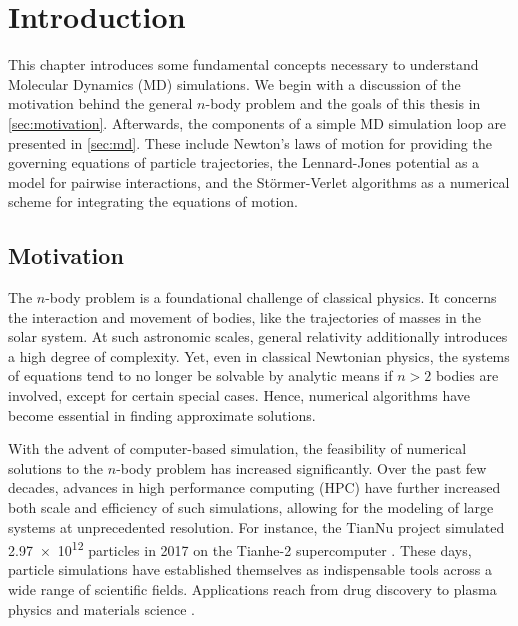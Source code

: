 \chapter[Introduction]{Introduction}
\label{cp:introduction}

{
	\parindent0pt
	This chapter introduces some fundamental concepts necessary to understand Molecular Dynamics (MD) simulations. We begin with a discussion of the motivation behind the general $n$-body problem and the goals of this thesis in \autoref{sec:motivation}.
	Afterwards, the components of a simple MD simulation loop are presented in \autoref{sec:md}. These include Newton’s laws of motion for providing the governing equations of particle trajectories, the Lennard-Jones potential as a model for pairwise interactions, and the Störmer-Verlet algorithms as a numerical scheme for integrating the equations of motion.
}



\section{Motivation}
\label{sec:motivation}

The $n$-body problem is a foundational challenge of classical physics. It  concerns the interaction and movement of bodies, like the trajectories of masses in the solar system. At such astronomic scales, general relativity additionally introduces a high degree of complexity. Yet, even in classical Newtonian physics, the systems of equations tend to no longer be solvable by analytic means if $n>2$ bodies are involved, except for certain special cases. Hence, numerical algorithms have become essential in finding approximate solutions. \cite{Arnold1985}

With the advent of computer-based simulation, the feasibility of numerical solutions to the $n$-body problem has increased significantly.
Over the past few decades, advances in high performance computing (HPC) have further increased both scale and efficiency of such simulations, allowing for the modeling of large systems at unprecedented resolution. For instance, the TianNu project simulated \num{2.97e12} particles in 2017 on the Tianhe-2 supercomputer \cite{Emberson2017}.
These days, particle simulations have established themselves as indispensable tools across a wide range of scientific fields. Applications reach from drug discovery \cite{Hollingsworth2018} to plasma physics \cite{Verboncoeur2005} and materials science \cite{Parteli2016}.

